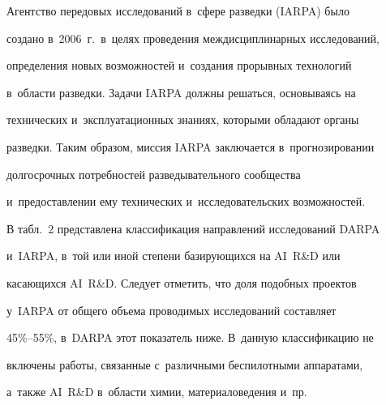   Агентство передовых исследований в~сфере разведки (\mbox{IARPA}) было


создано в~2006~г.\ в~целях проведения междисциплинарных исследований,


определения новых возможностей и~создания прорывных технологий


в~области разведки. Задачи \mbox{IARPA} должны решаться, основываясь на


технических и~эксплуатационных знаниях, которыми обладают органы


разведки. Таким образом, миссия \mbox{IARPA} заключается в~прогнозировании


долгосрочных по\-треб\-но\-стей разведывательного сообщества


и~предоставлении ему технических и~исследовательских воз\-мож\-но\-стей.





  В табл.~2 представлена классификация направлений исследований \mbox{DARPA}


и~\mbox{IARPA}, в~той или иной степени ба\-зи\-ру\-ющих\-ся на AI~R\&D или


касающихся AI~R\&D. Следует отметить, что доля подобных проектов


у~\mbox{IARPA} от общего объема проводимых исследований со\-став\-ля\-ет


45\%--55\%, в~\mbox{DARPA} этот показатель ниже. В~данную классификацию не


включены работы, связанные с~различными беспилотными аппаратами,


а~так\-же AI~R\&D в~об\-ласти химии, материаловедения и~пр.








